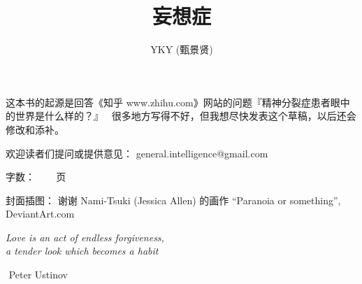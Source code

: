\documentclass[12pt]{report}
\newcommand{\tab}{\hspace*{1cm}}
\newcommand*\dashh{\textemdash\,\,}
\begin{document}

\cleardoublepage
\title{\Huge{妄想症}}
\author{YKY (甄景贤)}



\FPsub\resulta{\thedatezero}{\thedateone}
\FPdiv{}
\FPround{}

\FPsub\resultc{\thedatezero}{\thedatetwo}
\FPdiv{}
\FPround{}

\large

{\let\newpage\relax\maketitle}

\maketitle
\setlength{\parindent}{0em}
\setlength{\parskip}{2.8ex}

\small

\begin{framed}
这本书的起源是回答《知乎 www.zhihu.com》网站的问题『精神分裂症患者眼中的世界是什么样的？』 ~很多地方写得不好，但我想尽快发表这个草稿，以后还会修改和添补。

欢迎读者们提问或提供意见： general.intelligence@gmail.com

字数：   ~~~\pageref*{LastPage} 页

封面插图：  谢谢 Nami-Tsuki (Jessica Allen) 的画作 ``Paranoia or something'', DeviantArt.com
\end{framed}
\large

\newpage

\tab\tab\tab \parbox{9cm}{\textit{Love is an act of endless forgiveness,\\
a tender look which becomes a habit}}
\vspace{0.5cm}
\begin{flushright}
\dashh Peter Ustinov \hspace*{3cm}
\end{flushright}
\end{document}
